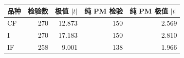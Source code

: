\begin{tabular}{lrrrr}
\toprule
品种 & 检验数 & 极值 $|t|$ & 纯 PM 检验 & 纯 PM 极值 $|t|$ \\
\midrule
CF & 270 & 12.873 & 150 & 2.569 \\
I & 270 & 17.183 & 150 & 2.810 \\
IF & 258 & 9.001 & 138 & 1.966 \\
\bottomrule
\end{tabular}
